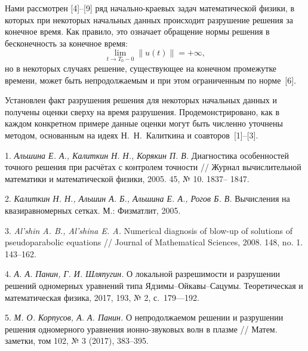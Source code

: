 




\vzmscaption


Нами рассмотрен [4]--[9] ряд начально-краевых задач математической физики, в которых при некоторых начальных данных происходит разрушение решения за конечное время. Как правило, это означает обращение нормы решения в бесконечность за конечное время:
\begin{equation*}
\lim_{t\to T_0-0}\|u(t)\|=+\infty,
\end{equation*}
но в некоторых случаях решение, существующее на конечном промежутке времени, может быть непродолжаемым и при этом ограниченным по норме~[6].

Установлен факт разрушения решения для некоторых начальных данных и получены оценки сверху на время разрушения. Продемонстрировано, как в каждом конкретном примере данные оценки могут быть численно уточнены методом, основанным на идеях Н.~Н.~Калиткина и соавторов~[1]--[3].





\litlist

1. {\it Альшина Е. А., Калиткин Н. Н., Корякин П. В.} Диагностика особенностей точного решения при расчётах с
контролем точности // Журнал вычислительной математики и математической физики, 2005. 45, № 10. 1837–
1847.

2. {\it Калиткин Н. Н., Альшин А. Б., Альшина Е. А., Рогов Б. В.} Вычисления на квазиравномерных сетках. М.: Физматлит, 2005.

3. {\it Al’shin A. B., Al’shina E. A.} Numerical diagnosis of blow-up of solutions of pseudoparabolic equations // Journal of
Mathematical Sciences, 2008. 148, no. 1. 143–162.


4.	{\it А. А. Панин, Г. И. Шляпугин.} О локальной разрешимости и разрушении решений одномерных уравнений типа Ядзимы–Ойкавы–Сацумы. Теоретическая и математическая физика, 2017, 193, № 2, с.~179—192. {\sloppy


}

5.	{\it М. О. Корпусов, А. А. Панин.} О непродолжаемом решении и разрушении решения одномерного уравнения ионно-звуковых волн в плазме // Матем. заметки, том 102, № 3 (2017), 383–395.

